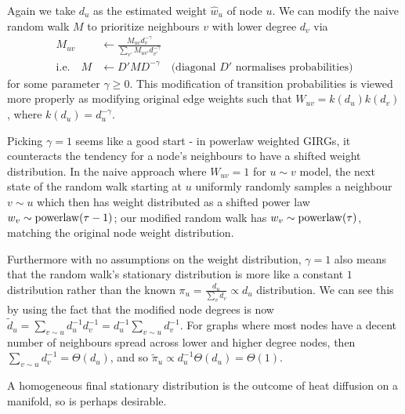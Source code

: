 Again we take $d_u$ as the estimated weight $\hat{w}_u$ of node $u$. 
We can modify the naive random walk $M$ to prioritize neighbours $v$ with lower degree $d_v$ via
\begin{align*}
  M_{uv} &\gets \frac{M_{uv} {d_v^{-\gamma}}}{\sum_{v'} M_{uv'} {d_{v'}^{-\gamma}}}
  \\
  \text{i.e.} \quad M &\gets D' M D^{-\gamma} \quad \text{(diagonal $D'$ normalises probabilities)}
\end{align*}
for some parameter $\gamma \geq 0$. This modification of transition probabilities is viewed more properly as modifying original edge weights such that $W_{uv} = k(d_u) k(d_v)$, where $k(d_u) = d_u^{-\gamma}$.


Picking $\gamma=1$ seems like a good start - in powerlaw weighted GIRGs, it counteracts the tendency for a node's neighbours to have a shifted weight distribution. In the naive approach where $W_{uv} = 1$ for $u \sim v$  model, the next state of the random walk starting at $u$ uniformly randomly samples a neighbour $v \sim u$ which then has weight distributed as a shifted power law $w_v \sim \operatorname{powerlaw}(\tau - 1)$; our modified random walk has $w_v \sim \operatorname{powerlaw}(\tau)$, matching the original node weight distribution. 

Furthermore with no assumptions on the weight distribution, $\gamma=1$ also means that the random walk's stationary distribution is more like a constant $1$ distribution rather than the known $\pi_u = \frac{d_u}{\sum_v d_v} \propto d_u$ distribution.
We can see this by using the fact that the modified node degrees is now $\tilde{d}_u = \sum_{v \sim u} d_u^{-1} d_v^{-1} = d_u^{-1} \sum_{v \sim u} d_v^{-1}$.
For graphs where most nodes have a decent number of neighbours spread across lower and higher degree nodes, then $\sum_{v \sim u} d_v^{-1} = \Theta(d_u)$, and so $\tilde{\pi}_u \propto d_u^{-1} \Theta(d_u) = \Theta(1)$.

A homogeneous final stationary distribution is the outcome of heat diffusion on a manifold, so is perhaps desirable.


